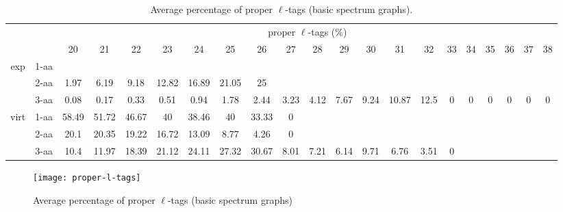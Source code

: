 \documentclass{article}[12pt]
\begin{document}
\begin{landscape}
\begin{table}[h]\tiny
\vspace{3mm}
{\centering
\begin{center}
\begin{tabular}{|c|l|c|c|c|c|c|c|c|c|c|c|c|c|c|c|c|c|c|c|c|}
  \hline
  \multicolumn{2}{|c|}{ } & \multicolumn{ 19 }{|c|}{ proper $\ell$-tags (\%)} \\
  \cline{3- 21}
  \multicolumn{2}{|c|}{ }  & 20 & 21 & 22 & 23 & 24 & 25 & 26 & 27 & 28 & 29 & 30 & 31 & 32 & 33 & 34 & 35 & 36 & 37 & 38\\
  \hline
  \multirow{3}{*}{exp}
&  1-aa  &  &  &  &  &  &  &  &  &  &  &  &  &  &  &  &  &  &  & \\
&  2-aa  & 1.97 & 6.19 & 9.18 & 12.82 & 16.89 & 21.05 & 25 &  &  &  &  &  &  &  &  &  &  &  & \\
&  3-aa  & 0.08 & 0.17 & 0.33 & 0.51 & 0.94 & 1.78 & 2.44 & 3.23 & 4.12 & 7.67 & 9.24 & 10.87 & 12.5 & 0 & 0 & 0 & 0 & 0 & 0\\
 \hline
  \multirow{3}{*}{virt} 
&  1-aa  & 58.49 & 51.72 & 46.67 & 40 & 38.46 & 40 & 33.33 & 0 &  &  &  &  &  &  &  &  &  &  & \\
&  2-aa  & 20.1 & 20.35 & 19.22 & 16.72 & 13.09 & 8.77 & 4.26 & 0 &  &  &  &  &  &  &  &  &  &  & \\
&  3-aa  & 10.4 & 11.97 & 18.39 & 21.12 & 24.11 & 27.32 & 30.67 & 8.01 & 7.21 & 6.14 & 9.71 & 6.76 & 3.51 & 0 &  &  &  &  & \\
 \hline
\end{tabular}
\end{center}
\par}
\centering
\caption{ Average percentage of proper $\ell$-tags (basic spectrum graphs).}
\label{table:proper-l-tags}
\vspace{3mm}
\end{table}

\end{landscape}

\begin{figure}
  \begin{center}
\texttt{[image: proper-l-tags]}
\end{center}
\caption{Average percentage of proper $\ell$-tags (basic spectrum graphs)}
  \label{fig:proper-l-tags}
\end{figure}
\end{document}
